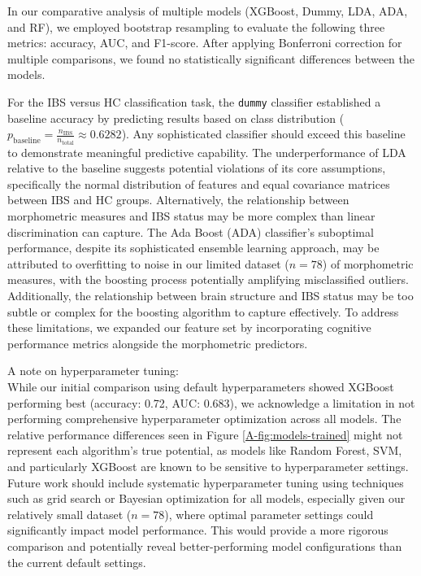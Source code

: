 \documentclass[diagnostics,article,accept,pdftex,moreauthors]{Definitions/mdpi}
\begin{document}
{
In our comparative analysis of multiple models (XGBoost, Dummy, LDA, ADA, and RF), we employed bootstrap resampling to evaluate the following three metrics: accuracy, AUC, and F1-score. After applying Bonferroni correction for multiple comparisons, we found no statistically significant differences between the models.

For the IBS versus HC classification task, the \texttt{dummy} classifier established a baseline accuracy by predicting results based on class distribution ($p_{\text{baseline}} = \frac{n_{\text{IBS}}}{n_{\text{total}}} \approx 0.6282$). Any sophisticated classifier should exceed this baseline to demonstrate meaningful predictive capability. The underperformance of LDA relative to the baseline suggests potential violations of its core assumptions, specifically the normal distribution of features and equal covariance matrices between IBS and HC groups. Alternatively, the relationship between morphometric measures and IBS status may be more complex than linear discrimination can capture.
The Ada Boost (ADA) classifier's suboptimal performance, despite its sophisticated ensemble learning approach, may be attributed to overfitting to noise in our limited dataset ($n = 78$) of morphometric measures, with the boosting process potentially amplifying misclassified outliers. Additionally, the relationship between brain structure and IBS status may be too subtle or complex for the boosting algorithm to capture effectively. To address these limitations, we expanded our feature set by incorporating cognitive performance metrics alongside the morphometric predictors.
}




\noindent A note on hyperparameter tuning:\\ %
{While our initial comparison using default hyperparameters showed XGBoost performing best (accuracy: 0.72, AUC: 0.683), we acknowledge a limitation in not performing comprehensive hyperparameter optimization across all models. The relative performance differences seen in Figure \ref{A-fig:models-trained} might not represent each algorithm's true potential, as models like Random Forest, SVM, and particularly XGBoost are known to be sensitive to hyperparameter settings. Future work should include systematic hyperparameter tuning using techniques such as grid search or Bayesian optimization for all models, especially given our relatively small dataset ($n=78$), where optimal parameter settings could significantly impact model performance. This would provide a more rigorous comparison and potentially reveal better-performing model configurations than the current default settings.}
\end{document}
